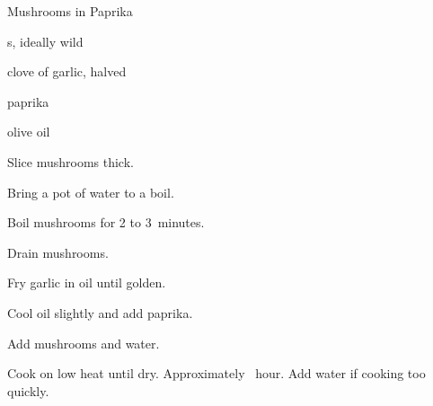 \begin{recipe}{Mushrooms in Paprika}{}{}

\begin{ingredients}
\item {}s, ideally wild
\item clove of garlic, halved
\item paprika
\item olive oil
\end{ingredients}

\begin{directions}
\item Slice mushrooms \inch{\quarter} thick.
\item Bring a pot of water to a boil.
\item Boil mushrooms for 2 to 3~minutes.
\item Drain mushrooms.
\item Fry garlic in oil until golden.
\item Cool oil slightly and add paprika.
\item Add mushrooms and \C{\half} water.
\item Cook on low heat until dry. Approximately \half~hour. Add water if cooking too quickly.
\end{directions}

\end{recipe}
